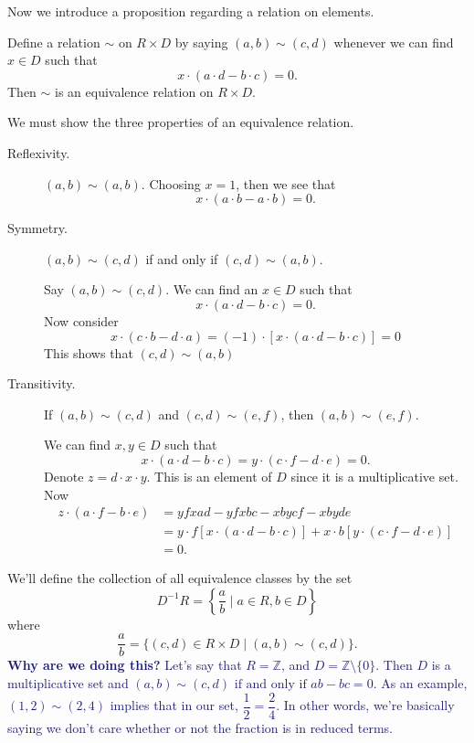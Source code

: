 \documentclass[12pt,letterpaper]{algebra_book}
\theoremstyle{definition}
\begin{document}
    Now we introduce a proposition regarding a relation on
    elements. 
    \begin{proposition}
        Define a relation $\sim$ on $R \times D$ by saying $(a, b) \sim
        (c,d)$ whenever we can find $x \in D$ such that 
        \[
            x\cdot (a\cdot d - b \cdot c) = 0.
        \]
        Then $\sim$ is an equivalence relation on $R \times D$. 
    \end{proposition}
    \begin{prf}
        We must show the three properties of an equivalence
        relation. 
        \begin{description}
            \item[Reflexivity.] $(a, b)\sim(a, b)$. Choosing $x = 1$,
            then we see that 
            \[
                x\cdot(a\cdot b - a\cdot b) = 0.  
            \]

            \item[Symmetry.] $(a, b) \sim (c, d)$ if and only if $(c,
            d) \sim (a, b)$. 

            Say $(a, b) \sim (c, d)$. We can find an $x \in D$ such
            that 
            \[
                x\cdot(a\cdot d - b \cdot c) = 0.
            \]
            Now consider 
            \[
                x\cdot (c\cdot b - d \cdot a) = (-1)\cdot[x\cdot (a\cdot d - b \cdot c)] = 0
            \]
            This shows that $(c, d) \sim (a, b)$ 

            \item[Transitivity.] If $(a, b) \sim (c, d)$ and $(c, d) \sim
            (e, f)$, then $(a, b) \sim (e, f)$. 

            We can find $x, y \in D$ such that 
            \[
                x \cdot (a \cdot d - b \cdot c) = y \cdot (c \cdot f - d \cdot e) = 0.
            \]
            Denote $z = d \cdot x \cdot y$. This is an element of
            $D$ since it is a multiplicative set. Now 
            \begin{align*}
                z \cdot (a \cdot f - b \cdot e) & = yfxad - yfxbc - xbycf - xbyde\\
                & = 
                y \cdot f [x \cdot (a \cdot d  - b \cdot c)] + x\cdot b[y \cdot(c \cdot f - d \cdot e)]\\
                & = 0.
            \end{align*}
        \end{description}
    \end{prf}
    \noindent We'll define the collection of all equivalence classes by the
    set 
    \[
        D^{-1}R = \left\{\frac{a}{b} \mid a \in R, b \in D  \right\}
    \]
    where 
    \[ 
        \dfrac{a}{b} = \big\{ (c, d) \in R \times D \mid (a ,
    b) \sim (c, d) \big\}.
    \]
    \textcolor{MidnightBlue}{\textbf{Why are we doing this?} Let's say that $R = \mathbb{Z}$, and
    $D = \mathbb{Z}\setminus\{0\}$. Then $D$ is a multiplicative
    set and $(a, b) \sim (c, d) \text{ if and only if } ab - bc = 0$. As an
    example, $(1, 2) \sim (2, 4)$ implies that in our set,
    $\dfrac{1}{2} = \dfrac{2}{4}$. In other words, we're basically
    saying we don't care whether or not the fraction is in reduced
    terms.}
\end{document}

